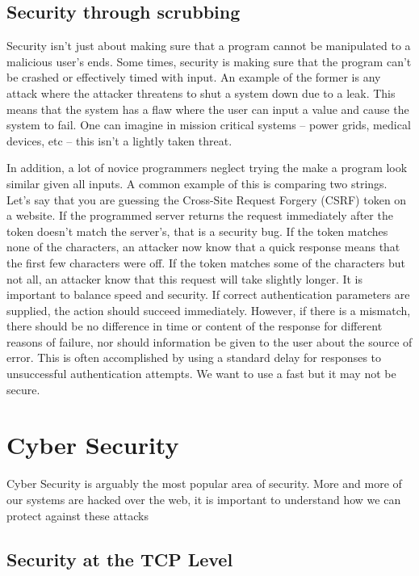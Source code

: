 \subsection{Security through scrubbing}

Security isn't just about making sure that a program cannot be manipulated to a malicious user's ends.
Some times, security is making sure that the program can't be crashed or effectively timed with input.
An example of the former is any attack where the attacker threatens to shut a system down due to a leak.
This means that the system has a flaw where the user can input a value and cause the system to fail.
One can imagine in mission critical systems -- power grids, medical devices, etc -- this isn't a lightly taken threat.

In addition, a lot of novice programmers neglect trying the make a program look similar given all inputs.
A common example of this is comparing two strings.
Let's say that you are guessing the Cross-Site Request Forgery (CSRF) token on a website.
If the programmed server returns the request immediately after the token doesn't match the server's, that is a security bug.
If the token matches none of the characters, an attacker now know that a quick response means that the first few characters were off.
If the token matches some of the characters but not all, an attacker know that this request will take slightly longer.
It is important to balance speed and security.
If correct authentication parameters are supplied, the action should succeed immediately.
However, if there is a mismatch, there should be no difference in time or content of the response for different reasons of failure, nor should information be given to the user about the source of error.
This is often accomplished by using a standard delay for responses to unsuccessful authentication attempts.
We want to use a fast  but it may not be secure.

\section{Cyber Security}

Cyber Security is arguably the most popular area of security.
More and more of our systems are hacked over the web, it is important to understand how we can protect against these attacks

\subsection{Security at the TCP Level}

